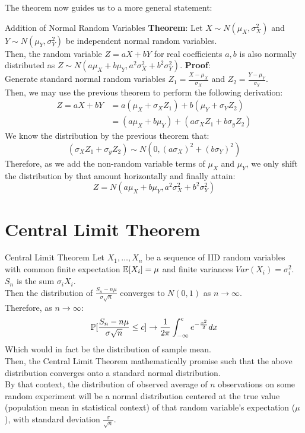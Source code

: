 The theorem now guides us to a more general statement:
\begin{ln-theorem}{Addition of Normal Random Variables}{}
    \textbf{Theorem}: Let $X \sim N(\mu_X, \sigma_X^2)$ and $Y \sim N(\mu_Y, \sigma_Y^2)$ be independent normal random variables. \\
    Then, the random variable $Z = aX + bY$ for real coefficients $a, b$ is also normally distributed as $Z \sim N(a\mu_X + b\mu_Y, a^2 \sigma_X^2 + b^2 \sigma_Y^2)$.
    \tcblower
    \textbf{Proof}: \\
    Generate standard normal random variables $Z_1 = \frac{X - \mu_X}{\sigma_X}$ and $Z_2 = \frac{Y - \mu_Y}{\sigma_Y}$. \\
    Then, we may use the previous theorem to perform the following derivation:
    \begin{align*}
        Z = aX + bY &= a(\mu_X + \sigma_X Z_1) + b(\mu_Y + \sigma_Y Z_2) \\
        &= (a\mu_X + b\mu_Y) + (a\sigma_X Z_1 + b\sigma_y Z_2)
    \end{align*}
    We know the distribution by the previous theorem that:
    \[(\sigma_X Z_1 + \sigma_y Z_2) \sim N(0, {(a \sigma_X)}^2 + {(b\sigma_Y)}^2)\]
    Therefore, as we add the non-random variable terms of $\mu_X$ and $\mu_Y$, we only shift the distribution by that amount horizontally and finally attain:
    \[Z = N(a\mu_X + b\mu_Y, a^2 \sigma_X^2 + b^2 \sigma_Y^2)\]
\end{ln-theorem}

\section{Central Limit Theorem}
\begin{ln-theorem}{Central Limit Theorem}{}
    Let $X_1, \dots, X_n$ be a sequence of IID random variables with common finite expectation $\E[X_i] = \mu$ and finite variances $Var(X_i) = \sigma_i^2$. $S_n$ is the sum $\sigma_i X_i$.\\
    Then the distribution of $\frac{S_n - n\mu}{\sigma \sqrt{n}}$ converges to $N(0, 1)$ as $n \rightarrow \infty$. \\
    Therefore, as $n \rightarrow \infty$:
    \[
        \P[\frac{S_n - n\mu}{\sigma \sqrt{n}} \leq c] \rightarrow \frac{1}{2\pi} \int_{-\infty}^c e^{-\frac{x^2}{2}} dx
    \]
    Which would in fact be the distribution of sample mean. \\
    Then, the Central Limit Theorem mathematically promise such that the above distribution converges onto a standard normal distribution. \\
    By that context, the distribution of observed average of $n$ observations on some random experiment will be a normal distribution centered at the true value (population mean in statistical context) of that random variable's expectation ($\mu$), with standard deviation $\frac{\sigma}{\sqrt{n}}$.
\end{ln-theorem}
